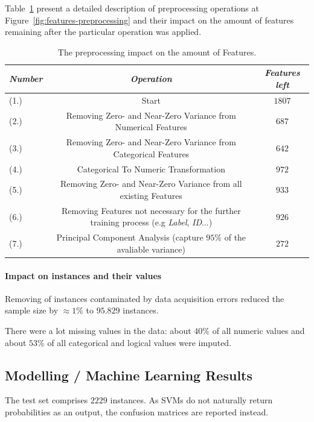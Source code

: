 Table~\ref{tab:feature-reduction} present a detailed description of preprocessing operations at Figure~\ref{fig:features-preprocessing} and their impact on the amount of features remaining after the particular operation was applied.
\begin{table}[h!]
  \begin{center} 
    \caption{The preprocessing impact on the amount of Features.}
    \label{tab:feature-reduction}
   \hspace*{-1cm} \begin{tabular}{|l|c|c|}\hline
    \textit{Number} & \textit{Operation} & \textit{Features left} \\
      \hline
     (1.) & Start & \(1807\) \\ 
     \hline
     (2.) & Removing Zero- and Near-Zero Variance from Numerical Features  &  \(687\) \\
     \hline
     (3.) & Removing Zero- and Near-Zero Variance from Categorical Features &  \(642\) \\
     \hline
     (4.) & Categorical To Numeric Transformation &  \(972\) \\
     \hline
     (5.) &  Removing Zero- and Near-Zero Variance from all existing Features &  \(933\) \\
     \hline
     (6.) &  Removing Features not necessary for the further training process (e.g \textit{Label}, \textit{ID}...) &  \(926\) \\
     \hline
     (7.) & Principal Component Analysis (capture \(95\%\) of the avaliable variance) &  \(272\) \\
     \hline
    \end{tabular}
  \end{center}
\end{table}

\paragraph*{Impact on instances and their values} \hfill \break
Removing of instances contaminated by data acquisition errors reduced the sample size by \(\approx1\%\) to \(95.829\) instances.

There were a lot missing values in the data: about $40\%$ of all numeric values and about $53\%$ of all categorical and logical values were imputed.

\subsection{Modelling / Machine Learning Results}
The test set comprises \(2229\) instances. As SVMs do not naturally return probabilities as an output, the confusion matrices are reported instead.

